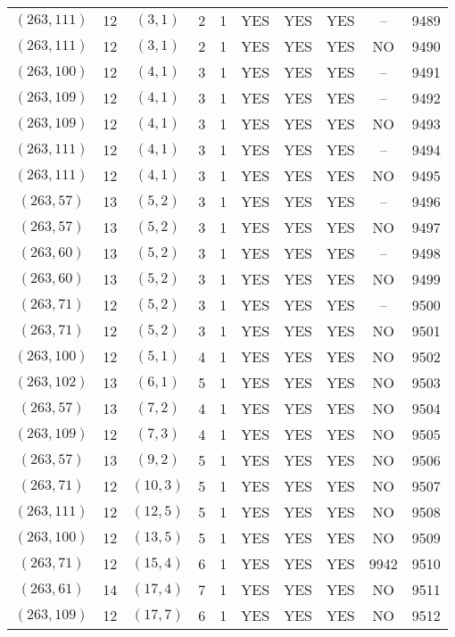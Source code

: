 \begin{longtable}{|c|c|c|c|c|c|c|c|c|c|}
$(263, 111)$ & 12 & $(3, 1)$ & 2 & 1 & YES & YES & YES & -- & 9489\\
$(263, 111)$ & 12 & $(3, 1)$ & 2 & 1 & YES & YES & YES & NO & 9490\\
$(263, 100)$ & 12 & $(4, 1)$ & 3 & 1 & YES & YES & YES & -- & 9491\\
$(263, 109)$ & 12 & $(4, 1)$ & 3 & 1 & YES & YES & YES & -- & 9492\\
$(263, 109)$ & 12 & $(4, 1)$ & 3 & 1 & YES & YES & YES & NO & 9493\\
$(263, 111)$ & 12 & $(4, 1)$ & 3 & 1 & YES & YES & YES & -- & 9494\\
$(263, 111)$ & 12 & $(4, 1)$ & 3 & 1 & YES & YES & YES & NO & 9495\\
$(263, 57)$ & 13 & $(5, 2)$ & 3 & 1 & YES & YES & YES & -- & 9496\\
$(263, 57)$ & 13 & $(5, 2)$ & 3 & 1 & YES & YES & YES & NO & 9497\\
$(263, 60)$ & 13 & $(5, 2)$ & 3 & 1 & YES & YES & YES & -- & 9498\\
$(263, 60)$ & 13 & $(5, 2)$ & 3 & 1 & YES & YES & YES & NO & 9499\\
$(263, 71)$ & 12 & $(5, 2)$ & 3 & 1 & YES & YES & YES & -- & 9500\\
$(263, 71)$ & 12 & $(5, 2)$ & 3 & 1 & YES & YES & YES & NO & 9501\\
$(263, 100)$ & 12 & $(5, 1)$ & 4 & 1 & YES & YES & YES & NO & 9502\\
$(263, 102)$ & 13 & $(6, 1)$ & 5 & 1 & YES & YES & YES & NO & 9503\\
$(263, 57)$ & 13 & $(7, 2)$ & 4 & 1 & YES & YES & YES & NO & 9504\\
$(263, 109)$ & 12 & $(7, 3)$ & 4 & 1 & YES & YES & YES & NO & 9505\\
$(263, 57)$ & 13 & $(9, 2)$ & 5 & 1 & YES & YES & YES & NO & 9506\\
$(263, 71)$ & 12 & $(10, 3)$ & 5 & 1 & YES & YES & YES & NO & 9507\\
$(263, 111)$ & 12 & $(12, 5)$ & 5 & 1 & YES & YES & YES & NO & 9508\\
$(263, 100)$ & 12 & $(13, 5)$ & 5 & 1 & YES & YES & YES & NO & 9509\\
$(263, 71)$ & 12 & $(15, 4)$ & 6 & 1 & YES & YES & YES & 9942 & 9510\\
$(263, 61)$ & 14 & $(17, 4)$ & 7 & 1 & YES & YES & YES & NO & 9511\\
$(263, 109)$ & 12 & $(17, 7)$ & 6 & 1 & YES & YES & YES & NO & 9512\\

\end{longtable}
